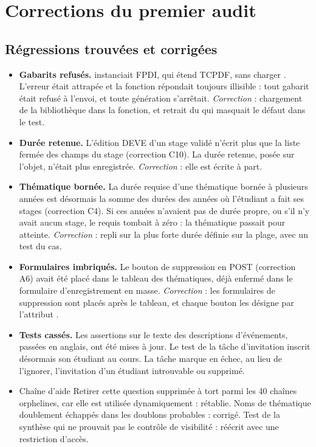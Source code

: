 \documentclass[11pt,a4paper]{article}
\newcommand{\grav}[1]{\textbf{\textcolor{#1}{\textbullet}}}
\newcommand{\maj}{\grav{orange}}
\newcommand{\mineure}{\grav{gray}}
\newcommand{\crit}{\grav{red}}
\begin{document}
\section{Corrections du premier audit}

\subsection{Régressions trouvées et corrigées}

\begin{itemize}
  \item[\crit] \textbf{Gabarits refusés.}  instanciait
    FPDI, qui étend TCPDF, sans charger . L'erreur était attrapée et la fonction
    répondait toujours \og illisible\fg{} : tout gabarit était refusé à l'envoi, et toute génération
    s'arrêtait. \emph{Correction} : chargement de la bibliothèque dans la fonction, et retrait du
     qui masquait le défaut dans le test.
  \item[\maj] \textbf{Durée retenue.} L'édition DEVE d'un stage validé n'écrit plus que la liste
    fermée des champs du stage (correction C10). La durée retenue, posée sur l'objet, n'était plus
    enregistrée. \emph{Correction} : elle est écrite à part.
  \item[\maj] \textbf{Thématique bornée.} La durée requise d'une thématique bornée à plusieurs années
    est désormais la somme des durées des années où l'étudiant a fait ses stages (correction C4).
    Si ces années n'avaient pas de durée propre, ou s'il n'y avait aucun stage, le requis tombait à
    zéro : la thématique passait pour atteinte. \emph{Correction} : repli sur la plus forte durée
    définie sur la plage, avec un test du cas.
  \item[\maj] \textbf{Formulaires imbriqués.} Le bouton de suppression en POST (correction A6) avait
    été placé dans le tableau des thématiques, déjà enfermé dans le formulaire d'enregistrement en
    masse. \emph{Correction} : les formulaires de suppression sont placés après le tableau, et chaque
    bouton les désigne par l'attribut .
  \item[\maj] \textbf{Tests cassés.} Les assertions sur le texte des descriptions d'événements, passées en anglais,
    ont été mises à jour. Le test de la tâche d'invitation inscrit désormais son étudiant au cours. La tâche
    marque en échec, au lieu de l'ignorer, l'invitation d'un étudiant introuvable ou supprimé.
  \item[\mineure] Chaîne d'aide \og Retirer cette question\fg{} supprimée à tort parmi les 40 chaînes
    orphelines, car elle est utilisée dynamiquement : rétablie. Noms de thématique doublement échappés dans les
    doublons probables : corrigé. Test de la synthèse qui ne prouvait pas le contrôle de visibilité :
    réécrit avec une restriction d'accès.
\end{itemize}
\end{document}

